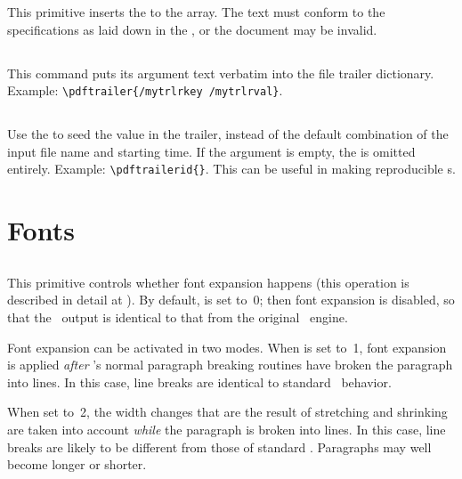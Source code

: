 \documentclass{pdftexmanual}
\begin{document}
This primitive inserts the  to the 
array. The text must conform to the specifications as laid down in the
\PDFReference, or the document may be invalid.

\subsection{}

This command puts its argument text verbatim into the file trailer
dictionary. Example: \verb|\pdftrailer{/mytrlrkey /mytrlrval}|.

\subsection{}

Use the  to seed the  value in the
trailer, instead of the default combination of the input file
name and starting time.  If the argument is empty, the  is
omitted entirely.  Example: \verb|\pdftrailerid{}|.  This can be useful
in making reproducible \PDF{}s.  

\section{Fonts}

\subsection{}

This primitive controls whether font expansion happens (this operation
is described in detail at ). By default,
 is set to~0; then font expansion is disabled, so
that the \PDFTEX\ output is identical to that from the original \TEX\
engine.

Font expansion can be activated in two modes. When 
is set to~1, font expansion is applied \emph{after} \TEX's normal
paragraph breaking routines have broken the paragraph into lines. In
this case, line breaks are identical to standard \TEX\ behavior.

When set to~2, the width changes that are the result of stretching and
shrinking are taken into account \emph{while} the paragraph is broken
into lines. In this case, line breaks are likely to be different from
those of standard \TEX. Paragraphs may well become longer or shorter.
\end{document}
